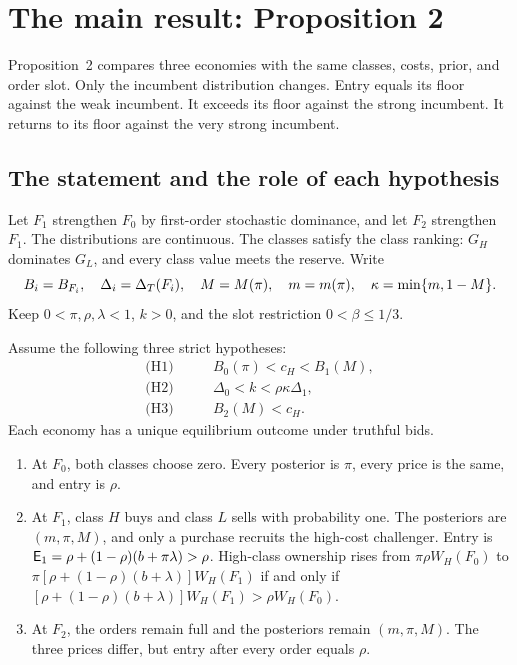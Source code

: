 \section{The main result: Proposition 2}
\label{sec:06_main_result}

Proposition~2 compares three economies with the same classes, costs, prior, and order slot.
Only the incumbent distribution changes.
Entry equals its floor against the weak incumbent.
It exceeds its floor against the strong incumbent.
It returns to its floor against the very strong incumbent.

\subsection{The statement and the role of each hypothesis}
\label{sec:06_main_result-statement}

Let $F_1$ strengthen $F_0$ by first-order stochastic dominance, and let $F_2$ strengthen $F_1$.
The distributions are continuous.
The classes satisfy the class ranking: $G_H$ dominates $G_L$, and every class value meets the reserve.
Write
\[
B_i=B_{F_i},\quad \Delta_i=\Delta_T(F_i),\quad M=M(\pi),\quad m=m(\pi),\quad
\kappa=\min\{m,1-M\}.
\]
Keep $0<\pi,\rho,\lambda<1$, $k>0$, and the slot restriction $0<\beta\le1/3$.

\begin{resultbox}
Assume the following three strict hypotheses:
\begin{align*}
\text{(H1)}&\qquad B_0(\pi)<c_H<B_1(M),\\
\text{(H2)}&\qquad \Delta_0<k<\rho\kappa\Delta_1,\\
\text{(H3)}&\qquad B_2(M)<c_H.
\end{align*}
Each economy has a unique equilibrium outcome under truthful bids. 
\begin{enumerate}[label=(\roman*),leftmargin=2em]
\item At $F_0$, both classes choose zero.
Every posterior is $\pi$, every price is the same, and entry is $\rho$.
\item At $F_1$, class $H$ buys and class $L$ sells with probability one.
The posteriors are $(m,\pi,M)$, and only a purchase recruits the high-cost challenger.
Entry is $\mathsf{E}_1=\rho+(1-\rho)(b+\pi\lambda)>\rho$.
High-class ownership rises from $\pi\rho W_H(F_0)$ to $\pi[\rho+(1-\rho)(b+\lambda)]W_H(F_1)$ if and only if
$[\rho+(1-\rho)(b+\lambda)]W_H(F_1)>\rho W_H(F_0)$.
\item At $F_2$, the orders remain full and the posteriors remain $(m,\pi,M)$.
The three prices differ, but entry after every order equals $\rho$.
\end{enumerate}
\end{resultbox}

